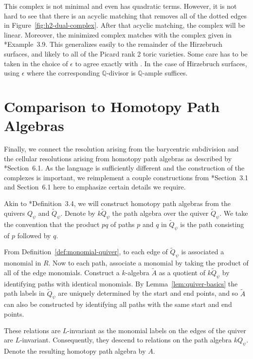 \documentclass{amsart}
\newcommand{\QQ}{\mathbb{Q}}
\newcommand{\field}{k}
\theoremstyle{remark}
\begin{document}
  This complex is not minimal and even has quadratic terms.
  However, it is not hard to see that there is an acyclic matching that removes all of the dotted edges in Figure~\ref{fig:h2-dual-complex}.
  After that acyclic matching, the complex will be linear.
  Moreover, the minimized complex matches with the complex given in \cite{brown-sayrafi}*{Example~3.9}.
  This generalizes easily to the remainder of the Hirzebruch surfaces, and likely to all of the Picard rank 2 toric varieties.
  Some care has to be taken in the choice of $\epsilon$ to agree exactly with \cite{brown-sayrafi}.
  In the case of Hirzebruch surfaces, using $\epsilon$ where the corresponding $\QQ$-divisor is $\QQ$-ample suffices.

\section{Comparison to Homotopy Path Algebras}
\label{sec:hpa}

Finally, we connect the resolution arising from the barycentric subdivision and the cellular resolutions arising from homotopy path algebras as described by \cite{FH25}*{Section~6.1}.
As the language is sufficiently different and the construction of the complexes is important, we reimplement a couple constructions from \cite{FH25}*{Section~3.1 and Section~6.1} here to emphasize certain details we require.

Akin to \cite{FH25}*{Definition~3.4}, we will construct homotopy path algebras from the quivers $Q_\psi$ and $\widetilde{Q}_\psi$.
Denote by $\field \widetilde{Q}_\psi$ the path algebra over the quiver $\widetilde{Q}_\psi$. We take the convention that the product $pq$ of paths $p$ and $q$ in $\widetilde{Q}_\psi$ is the path consisting of $p$ followed by $q$.

From Definition~\ref{def:monomial-quiver}, to each edge of $\widetilde{Q}_\psi$ is associated a monomial in $R$. Now to each path, associate a monomial by taking the product of all of the edge monomials. Construct a $\field$-algebra $\widetilde{A}$ as a quotient of $\field \widetilde{Q}_\psi$ by identifying paths with identical monomials. By Lemma~\ref{lem:quiver-basics} the path labels in $\widetilde{Q}_\psi$ are uniquely determined by the start and end points, and so $\widetilde{A}$ can also be constructed by identifying all paths with the same start and end points.

These relations are $L$-invariant as the monomial labels on the edges of the quiver are $L$-invariant. Consequently, they descend to relations on the path algebra $\field Q_\psi$. Denote the resulting homotopy path algebra by $A$.
\end{document}
